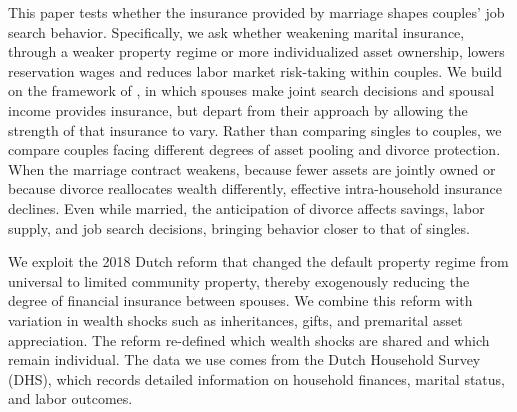 \documentclass[11pt]{article}
\begin{document}
This paper tests whether the insurance provided by marriage shapes couples’ job search behavior. Specifically, we ask whether weakening marital insurance, through a weaker property regime or more individualized asset ownership, lowers reservation wages and reduces labor market risk-taking within couples. We build on the framework of \cite{GULER2012352}, in which spouses make joint search decisions and spousal income provides insurance, but depart from their approach by allowing the strength of that insurance to vary. Rather than comparing singles to couples, we compare couples facing different degrees of asset pooling and divorce protection. When the marriage contract weakens, because fewer assets are jointly owned or because divorce reallocates wealth differently, effective intra-household insurance declines. Even while married, the anticipation of divorce affects savings, labor supply, and job search decisions, bringing behavior closer to that of singles.



We exploit the 2018 Dutch reform that changed the default property regime from universal
to limited community property, thereby exogenously reducing the degree of financial insurance between
spouses. We combine this reform with variation in wealth shocks such as inheritances, gifts, and premarital asset appreciation. The reform re-defined which wealth shocks are shared and which remain individual. The data we use comes from the Dutch Household Survey (DHS), which records detailed information on household finances, marital status, and labor outcomes.
\end{document}

